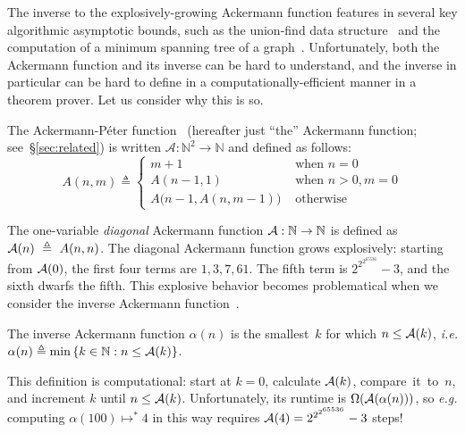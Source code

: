 The inverse to the explosively-growing Ackermann function
features in several key algorithmic asymptotic
bounds, such as the union-find data structure~\cite{tarjan} and
the computation of a minimum spanning
tree of a graph~\cite{chazelle}.  Unfortunately, both the Ackermann
function and its inverse
can be hard to understand, and the inverse in particular can be hard to define in a computationally-efficient manner in a theorem prover.  Let us consider why this
is so.
\begin{defn} \label{defn: ack}
The Ackermann-P\'eter function~\cite{peter} (hereafter just
``the'' \linebreak[4] Ackermann function; see~\S\ref{sec:related}) is
written $\mathcal{A} : \mathbb{N}^2 \to \mathbb{N}$ and defined as follows:
\begin{equation}
\label{eq:ackermann}
A(n, m) \triangleq \begin{cases}
m + 1 & \text{ when } n = 0 \\
A(n-1, 1) & \text{ when } n > 0, m = 0 \\
A\big(n-1, A(n, m-1)\big) & \text{ otherwise}
\end{cases}
\end{equation}
\end{defn}

The one-variable \emph{diagonal} Ackermann function $\mathcal{A} : \mathbb{N} \to \mathbb{N}$ is defined as $\mathcal{A}(n)~\triangleq~A(n, n)$.	
The diagonal Ackermann function grows explosively: starting from $\mathcal{A}(0)$, the first four terms are $1, 3, 7, 61$.  The fifth term is $2^{2^{2^{65536}}}-3$, and the sixth dwarfs the fifth.
This explosive behavior becomes problematical when we consider
the inverse Ackermann function~\cite{chazelle,tarjan}.
\begin{defn} \label{defn: inv_ack}
The inverse Ackermann function $\alpha(n)$ is the smallest~$k$ for
\linebreak which $n \le \mathcal{A}(k)$, \emph{i.e.} $\alpha(n) \triangleq \min\left\{k\in \mathbb{N} : n \le \mathcal{A}(k)\right\}$.
\end{defn}
This definition is computational: start at $k=0$, calculate $\mathcal{A}(k)$,
compare~it~to~$n$, and increment $k$ until $n \le \mathcal{A}(k)$.
Unfortunately, its runtime is $\Omega(\mathcal{A}(\alpha(n)))$,
so \emph{e.g.} computing $\alpha(100) \mapsto^{*} 4$ in this way requires
$\mathcal{A}(4) = 2^{2^{2^{65536}}}-3$ steps!


